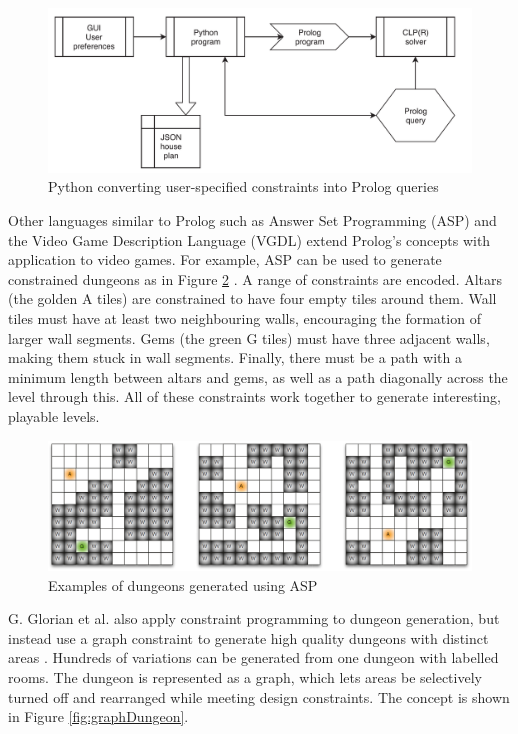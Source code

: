 \begin{figure}[H]
    \centering
    \includegraphics[width=\textwidth, height=0.3\textheight, keepaspectratio]{Images/PythonToProlog.png}
    \caption{Python converting user-specified constraints into Prolog queries \cite{Prolog_Deep_Learning}}
    \label{fig:pythonToProlog}
\end{figure}

Other languages similar to Prolog such as Answer Set Programming (ASP) and the Video Game Description Language (VGDL) extend Prolog's concepts with application to video games. For example, ASP can be used to generate constrained dungeons as in Figure \ref{fig:aspDungeons} \cite{pcgbook}. A range of constraints are encoded. Altars (the golden A tiles) are constrained to have four empty tiles around them. Wall tiles must have at least two neighbouring walls, encouraging the formation of larger wall segments. Gems (the green G tiles) must have three adjacent walls, making them stuck in wall segments. Finally, there must be a path with a minimum length between altars and gems, as well as a path diagonally across the level through this. All of these constraints work together to generate interesting, playable levels.

\begin{figure}[H]
    \centering
    \includegraphics[width=\textwidth, height=0.3\textheight, keepaspectratio]{Images/ASPDungeons.png}
    \caption{Examples of dungeons generated using ASP \cite{pcgbook}}
    \label{fig:aspDungeons}
\end{figure}

G. Glorian et al. also apply constraint programming to dungeon generation, but instead use a graph constraint to generate high quality dungeons with distinct areas \cite{Graph_Constraint_Dungeon}. Hundreds of variations can be generated from one dungeon with labelled rooms. The dungeon is represented as a graph, which lets areas be selectively turned off and rearranged while meeting design constraints. The concept is shown in Figure \ref{fig:graphDungeon}.

